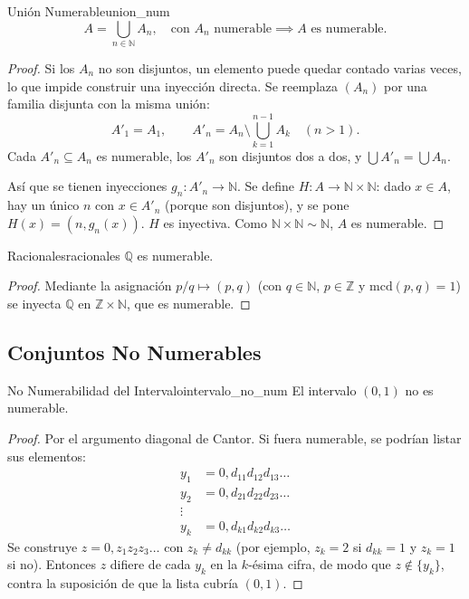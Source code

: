 \documentclass[11pt, a4paper]{article}
\begin{document}
\begin{teorema}{Unión Numerable}{union_num}
$$ A = \bigcup_{n \in \mathbb{N}} A_n, \quad \text{con } A_n \text{ numerable} \implies A
\text{ es numerable.} $$
\end{teorema}
\begin{proof}
Si los $A_n$ no son disjuntos, un elemento puede quedar contado varias veces, lo que impide construir
una inyección directa. Se reemplaza $(A_n)$ por una familia disjunta con la misma unión:
$$ A'_1 = A_1, \qquad A'_n = A_n \setminus \bigcup_{k=1}^{n-1} A_k \quad (n > 1). $$
Cada $A'_n \subseteq A_n$ es numerable, los $A'_n$ son disjuntos dos a dos, y
$\bigcup A'_n = \bigcup A_n$.

Así que se tienen inyecciones $g_n: A'_n \to \mathbb{N}$. Se define
$H: A \to \mathbb{N} \times \mathbb{N}$: dado $x \in A$, hay un único $n$ con $x \in A'_n$ (porque
son disjuntos), y se pone $H(x) = (n, g_n(x))$. $H$ es inyectiva. Como
$\mathbb{N} \times \mathbb{N} \sim \mathbb{N}$, $A$ es numerable.
\end{proof}

\begin{teorema}{Racionales}{racionales}
$\mathbb{Q}$ es numerable.
\end{teorema}
\begin{proof}
Mediante la asignación $p/q \mapsto (p, q)$ (con $q \in \mathbb{N}$, $p \in \mathbb{Z}$ y $\mathrm{mcd}(p,q)=1$)
se inyecta $\mathbb{Q}$ en $\mathbb{Z} \times \mathbb{N}$, que es numerable.
\end{proof}

\subsection{Conjuntos No Numerables}

\begin{teorema}{No Numerabilidad del Intervalo}{intervalo_no_num}
El intervalo $(0,1)$ no es numerable.
\end{teorema}

\begin{proof}
Por el argumento diagonal de Cantor. Si fuera numerable, se podrían listar sus elementos:
\begin{align*}
y_1 &= 0,d_{11}d_{12}d_{13}\dots \\
y_2 &= 0,d_{21}d_{22}d_{23}\dots \\
\vdots & \\
y_k &= 0,d_{k1}d_{k2}d_{k3}\dots
\end{align*}
Se construye $z = 0,z_1z_2z_3\dots$ con $z_k \ne d_{kk}$ (por ejemplo, $z_k = 2$ si $d_{kk}=1$ y
$z_k = 1$ si no). Entonces $z$ difiere de cada $y_k$ en la $k$-ésima cifra, de modo que
$z \notin \{y_k\}$, contra la suposición de que la lista cubría $(0,1)$.
\end{proof}
\end{document}

